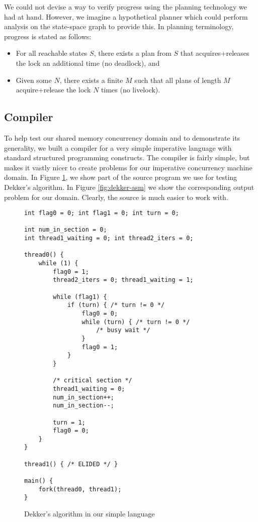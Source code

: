 \begin{enumerate}
		We could not devise a way to verify progress using the planning technology we had at hand. However, we imagine a hypothetical planner which could perform analysis on the state-space graph to provide this. In planning terminology, progress is stated as follows:
		\begin{itemize}
			\item For all reachable states $S$, there exists a plan from $S$ that acquires+releases the lock an additional time (no deadlock), and
			\item Given some $N$, there exists a finite $M$ such that all plans of length $M$ acquire+release the lock $N$ times (no livelock).
		\end{itemize}
\end{enumerate}

\subsection{Compiler}

To help test our shared memory concurrency domain and to demonstrate
its generality, we built a compiler for a very simple imperative
language with standard structured programming constructs. The compiler
is fairly simple, but makes it vastly nicer to create problems for our
imperative concurrency machine domain. In Figure
\ref{fig:dekker-code}, we show part of the source program we use for
testing Dekker's algorithm. In Figure \ref{fig:dekker-asm} we show the
corresponding output problem for our domain. Clearly, the source is
much easier to work with.



\begin{figure}
\begin{center}
\begin{verbatim}
int flag0 = 0; int flag1 = 0; int turn = 0;

int num_in_section = 0;
int thread1_waiting = 0; int thread2_iters = 0;

thread0() {
    while (1) {
        flag0 = 1;
        thread2_iters = 0; thread1_waiting = 1;

        while (flag1) {
            if (turn) { /* turn != 0 */
                flag0 = 0;
                while (turn) { /* turn != 0 */
                    /* busy wait */
                }
                flag0 = 1;
            }
        }

        /* critical section */
        thread1_waiting = 0;
        num_in_section++;
        num_in_section--;

        turn = 1;
        flag0 = 0;
    }
}

thread1() { /* ELIDED */ }

main() {
    fork(thread0, thread1);
}
\end{verbatim}
\end{center}
\caption{Dekker's algorithm in our simple language}
\label{fig:dekker-code}
\end{figure}

